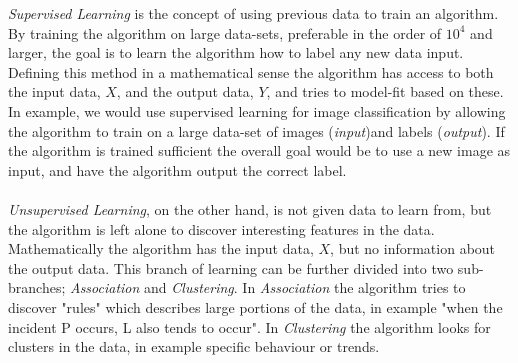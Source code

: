 \textit{Supervised Learning} is the concept of using previous data to train an algorithm. By training the algorithm on large data-sets, preferable in the order of $10^{4}$ and larger, the goal is to learn the algorithm how to label any new data input. Defining this method in a mathematical sense the algorithm has access to both the input data, $X$, and the output data, $Y$, and tries to model-fit based on these. In example, we would use supervised learning for image classification by allowing the algorithm to train on a large data-set of images (\textit{input})and labels (\textit{output}). If the algorithm is trained sufficient the overall goal would be to use a new image as input, and have the algorithm output the correct label.\\\\
\textit{Unsupervised Learning}, on the other hand, is not given data to learn from, but the algorithm is left alone to discover interesting features in the data. Mathematically the algorithm has the input data, $X$, but no information about the output data. This branch of learning can be further divided into two sub-branches; \textit{Association} and \textit{Clustering}. In \textit{Association} the algorithm tries to discover "rules" which describes large portions of the data, in example "when the incident P occurs, L also tends to occur". In \textit{Clustering} the algorithm looks for clusters in the data, in example specific behaviour or trends. 

